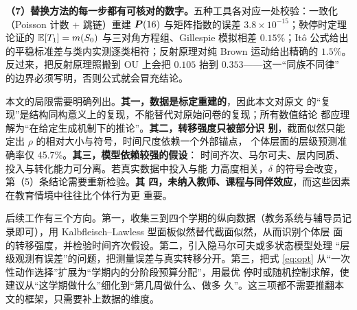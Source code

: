 \textbf{（7）替换方法的每一步都有可核对的数字。}五种工具各对应一处校验：一致化（Poisson 计数 +
跳链）重建 $\bm{P}(16)$ 与矩阵指数的误差 $3.8\times10^{-15}$；鞅停时定理论证的
$\mathbb{E}[T_1]=m(S_0)$ 与三对角方程组、Gillespie 模拟相差 $0.15\%$；Itô 公式给出
的平稳标准差与类内实测逐类相符；反射原理对纯 Brown 运动给出精确的 $1.5\%$。
反过来，把反射原理照搬到 OU 上会把 $0.105$ 抬到 $0.353$——这一“同族不同律”
的边界必须写明，否则公式就会冒充结论。

本文的局限需要明确列出。\textbf{其一，数据是标定重建的}，因此本文对原文
的“复现”是结构同构意义上的复现，不能替代对原始问卷的复现；所有数值结论
都应理解为“在给定生成机制下的推论”。\textbf{其二，转移强度只被部分识
别}，截面似然只能定出 $\rho$ 的相对大小与符号，时间尺度依赖一个外部锚点，
个体层面的层级预测准确率仅 45.7\%。\textbf{其三，模型依赖较强的假设}：
时间齐次、马尔可夫、层内同质、投入与转化能力可分离。若真实数据中投入与能
力高度相关，$\delta$ 的符号会改变，第（5）条结论需要重新检验。\textbf{其
四，未纳入教师、课程与同伴效应}，而这些因素在教育情境中往往比个体行为更
重要。

后续工作有三个方向。第一，收集三到四个学期的纵向数据（教务系统与辅导员记
录即可），用 Kalbfleisch--Lawless 型面板似然替代截面似然，从而识别个体层
面的转移强度，并检验时间齐次假设。第二，引入隐马尔可夫或多状态模型处理
“层级观测有误差”的问题，把测量误差与真实转移分开。第三，把式
\eqref{eq:opt} 从“一次性动作选择”扩展为“学期内的分阶段预算分配”，用最优
停时或随机控制求解，使建议从“这学期做什么”细化到“第几周做什么、做多
久”。这三项都不需要推翻本文的框架，只需要补上数据的维度。




